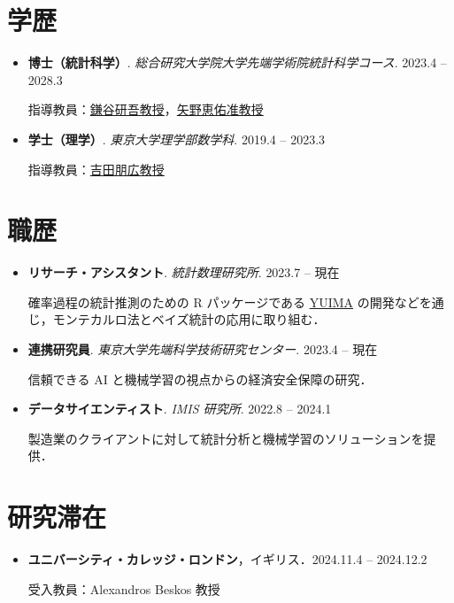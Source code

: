 \documentclass[
  11pt,
]{article}
\renewcommand{\labelitemi}{\textcolor{minty}{\faCheckCircle}} %
\begin{document}
\section{学歴}\label{ux5b66ux6b74}

\renewcommand{\labelitemi}{\textcolor{minty}{\faGraduationCap}}

\begin{itemize}
\item
  \textbf{博士（統計科学）}.
  \emph{総合研究大学院大学先端学術院統計科学コース}. \hfill {2023.4 --
  2028.3}

  指導教員：\href{https://sites.google.com/view/kengokamatani/home}{鎌谷研吾教授}，\href{https://sites.google.com/site/kyanostat/}{矢野恵佑准教授}
\item
  \textbf{学士（理学）}. \emph{東京大学理学部数学科}. \hfill {2019.4 --
  2023.3}

  指導教員：\href{https://www.ms.u-tokyo.ac.jp/~nakahiro/hp-naka-e}{吉田朋広教授}
\end{itemize}

\section{職歴}\label{ux8077ux6b74}

\renewcommand{\labelitemi}{\textcolor{minty}{\faUniversity}}

\begin{itemize}
\item
  \textbf{リサーチ・アシスタント}. \emph{統計数理研究所}. \hfill {2023.7
  -- 現在}

  確率過程の統計推測のための R パッケージである
  \href{https://r-forge.r-project.org/projects/yuima/}{YUIMA}
  の開発などを通じ，モンテカルロ法とベイズ統計の応用に取り組む．
\item
  \textbf{連携研究員}. \emph{東京大学先端科学技術研究センター}.
  \hfill {2023.4 -- 現在}

  信頼できる AI と機械学習の視点からの経済安全保障の研究．
\item
  \textbf{データサイエンティスト}. \emph{IMIS 研究所}. \hfill {2022.8 --
  2024.1}

  製造業のクライアントに対して統計分析と機械学習のソリューションを提供．
\end{itemize}

\section{研究滞在}\label{ux7814ux7a76ux6edeux5728}

\begin{itemize}
\item
  \textbf{ユニバーシティ・カレッジ・ロンドン}，イギリス．\hfill {2024.11.4
  -- 2024.12.2}

  受入教員：Alexandros Beskos 教授
\end{itemize}

\renewcommand{\labelitemi}{\textcolor{minty}{\faBookmark}}
\end{document}

